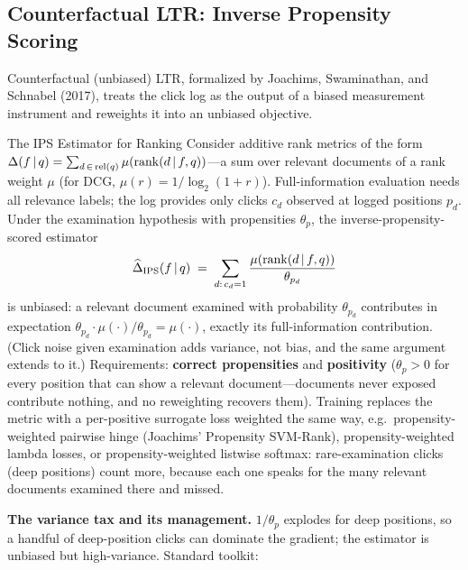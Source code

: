 \subsection{Counterfactual LTR: Inverse Propensity Scoring}

Counterfactual (unbiased) LTR, formalized by Joachims, Swaminathan, and Schnabel (2017), treats the click log as the output of a biased measurement instrument and reweights it into an unbiased objective.

\begin{mathresult}{The IPS Estimator for Ranking}
Consider additive rank metrics of the form $\Delta(f \,|\, q) = \sum_{d \,\in\, \text{rel}(q)} \mu\!\left(\operatorname{rank}(d \,|\, f, q)\right)$---a sum over relevant documents of a rank weight $\mu$ (for DCG, $\mu(r) = 1/\log_2(1+r)$). Full-information evaluation needs all relevance labels; the log provides only clicks $c_d$ observed at logged positions $p_d$. Under the examination hypothesis with propensities $\theta_p$, the inverse-propensity-scored estimator
\begin{equation}
\widehat{\Delta}_{\text{IPS}}(f \,|\, q) \;=\; \sum_{d:\, c_d = 1} \frac{\mu\!\left(\operatorname{rank}(d \,|\, f, q)\right)}{\theta_{p_d}}
\end{equation}
is unbiased: a relevant document examined with probability $\theta_{p_d}$ contributes in expectation $\theta_{p_d} \cdot \mu(\cdot)/\theta_{p_d} = \mu(\cdot)$, exactly its full-information contribution. (Click noise given examination adds variance, not bias, and the same argument extends to it.) Requirements: \textbf{correct propensities} and \textbf{positivity} ($\theta_p > 0$ for every position that can show a relevant document---documents never exposed contribute nothing, and no reweighting recovers them). Training replaces the metric with a per-positive surrogate loss weighted the same way, e.g.\ propensity-weighted pairwise hinge (Joachims' Propensity SVM-Rank), propensity-weighted lambda losses, or propensity-weighted listwise softmax: rare-examination clicks (deep positions) count more, because each one speaks for the many relevant documents examined there and missed.
\end{mathresult}

\textbf{The variance tax and its management.} $1/\theta_p$ explodes for deep positions, so a handful of deep-position clicks can dominate the gradient; the estimator is unbiased but high-variance. Standard toolkit:


